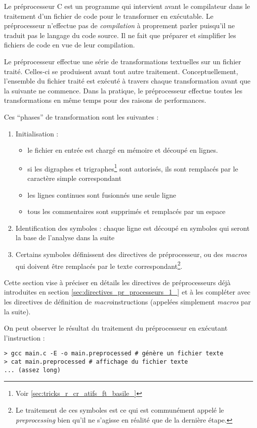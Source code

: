 \documentclass[../../../main.tex]{subfiles}
\begin{document}
Le préprocesseur C est un programme qui intervient avant le compilateur dans le traitement d'un fichier de code pour le transformer en exécutable. Le préprocesseur n'effectue pas de \textit{compilation} à proprement parler puisqu'il ne traduit pas le langage du code source. Il ne fait que préparer et simplifier les fichiers de code en vue de leur compilation.

Le préprocesseur effectue une série de transformations textuelles sur un fichier traité. Celles-ci se produisent avant tout autre traitement. Conceptuellement, l'ensemble du fichier traité est exécuté à travers chaque transformation avant que la suivante ne commence. Dans la pratique, le préprocesseur effectue toutes les transformations en même temps pour des raisons de performances.

Ces ``phases'' de transformation sont les suivantes :
\begin{enumerate}
	\item Initialisation :
	\begin{itemize}
		\item le fichier en entrée est chargé en mémoire et découpé en lignes.
		\item si les digraphes et trigraphes\footnote{Voir \ref{sec:tricks_r_cr_atifs_ft_basile_}} sont autorisés, ils sont remplacés par le caractère simple correspondant 
		\item les lignes continues sont fusionnés une seule ligne
		\item tous les commentaires sont supprimés et remplacés par un espace
	\end{itemize}
	\item Identification des symboles : chaque ligne est découpé en symboles qui seront la base de l'analyse dans la suite
	\item Certains symboles définissent des directives de préprocesseur, ou des \textit{macros} qui doivent être remplacés par le texte correspondant\footnote{Le traitement de ces symboles est ce qui est communément appelé le \textit{preprocessing} bien qu'il ne s'agisse en réalité que de la dernière étape.}.
\end{enumerate}	
Cette section vise à préciser en détails les directives de préprocesseurs déjà introduites en section \ref{sec:directives_pr_processeurs_1_} et à les compléter avec les directives de définition de \textit{macro}instructions (appelées simplement \textit{macros} par la suite).

On peut observer le résultat du traitement du préprocesseur en exécutant l'instruction :
\begin{verbatim}
> gcc main.c -E -o main.preprocessed # génère un fichier texte
> cat main.preprocessed # affichage du fichier texte
... (assez long)
\end{verbatim}
\end{document}
